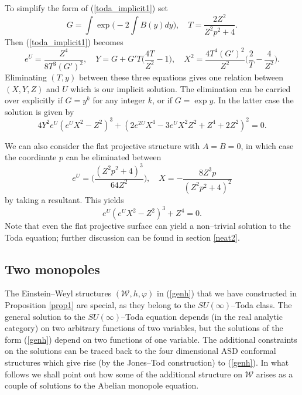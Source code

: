 To simplify the form of (\ref{toda_implicit1}) set
\[
G=\int\exp{\Big(-2\int B(y)dy\Big)}, \quad T=\frac{2Z^2}{Z^2p^2+4}.
\]
Then (\ref{toda_implicit1}) becomes
\[
e^U=\frac{Z^4}{8T^3 (G')^2}, \quad Y=G+G'T\Big(\frac{4T}{Z^2}-1\Big), \quad
X^2=\frac{4T^4(G')^2}{Z^2}\Big(\frac{2}{T}-\frac{4}{Z^2} \Big).
\]
Eliminating $(T, y)$ between these three equations gives one relation between $(X, Y, Z)$ and  $U$ which is our implicit solution.
The elimination can be carried over explicitly if $G=y^k$ for any integer $k$, or if $G=\exp{y}$. In the latter case the solution is given by
\[
4Y^2e^U(e^UX^2-Z^2)^3+(2e^{2U}X^4-3e^UX^2Z^2+Z^4+2Z^2)^2=0.
\]

We can also consider the flat projective structure with $A=B=0$, in which case
the coordinate $p$ can be eliminated between
\[
e^U=\bigg(\frac{(Z^2p^2+4)^3}{64Z^2}\bigg), \quad
X=-\frac{8Z^3p}{(Z^2p^2+4)^2}
\]
by taking a resultant. This yields
\[
e^U(e^UX^2-Z^2)^3+Z^4=0.
\]
Note that even the flat projective surface can yield a non--trivial solution to the Toda equation; further discussion can be found in section \ref{neat2}.


\subsection{Two monopoles}
The Einstein--Weyl structures $(\mathcal{W},h,\varphi)$ in (\ref{genh}) that we have constructed in Proposition \ref{prop1}
are special, as they belong to the $SU(\infty)$--Toda class. %
The general solution to the $SU(\infty)$--Toda equation depends (in the real analytic category) on 
two arbitrary functions of two variables, but the solutions of the form (\ref{genh}) depend on two functions of one variable. The additional constraints on the solutions can be traced back to the four dimensional ASD conformal structures
which give rise (by the Jones--Tod construction) to (\ref{genh}).
In what follows we shall point out how some of the additional structure on $\mathcal{W}$ arises as a couple of solutions to the Abelian monopole equation.

